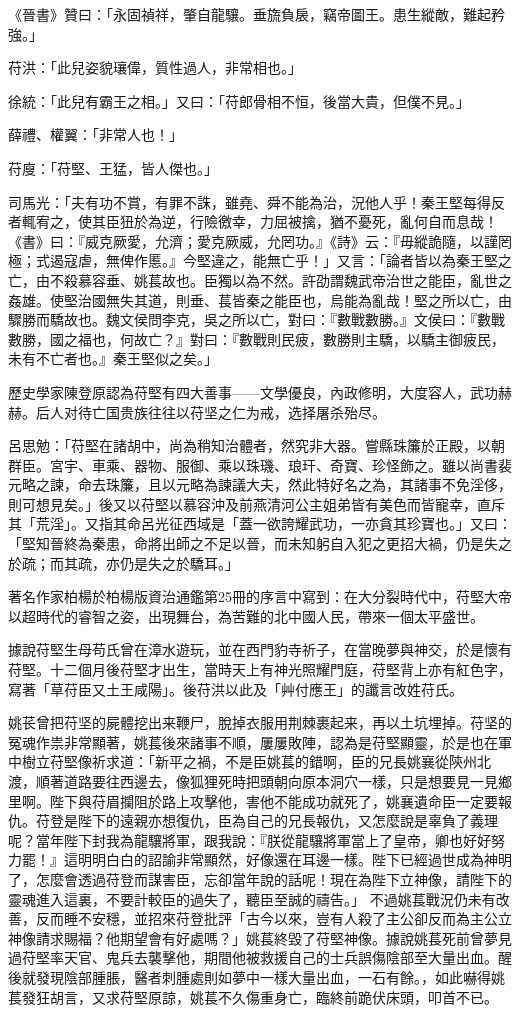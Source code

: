 《晉書》贊曰：「永固禎祥，肇自龍驤。垂旒負扆，竊帝圖王。患生縱敵，難起矜強。」

苻洪：「此兒姿貌瓖偉，質性過人，非常相也。」

徐統：「此兒有霸王之相。」又曰：「苻郎骨相不恒，後當大貴，但僕不見。」

薛禮、權翼：「非常人也！」

苻廋：「苻堅、王猛，皆人傑也。」

司馬光：「夫有功不賞，有罪不誅，雖堯、舜不能為治，況他人乎！秦王堅每得反者輒宥之，使其臣狃於為逆，行險徼幸，力屈被擒，猶不憂死，亂何自而息哉！《書》曰：『威克厥愛，允濟；愛克厥威，允罔功。』《詩》云：『毋縱詭隨，以謹罔極；式遏寇虐，無俾作慝。』今堅違之，能無亡乎！」又言：「論者皆以為秦王堅之亡，由不殺慕容垂、姚萇故也。臣獨以為不然。許劭謂魏武帝治世之能臣，亂世之姦雄。使堅治國無失其道，則垂、萇皆秦之能臣也，烏能為亂哉！堅之所以亡，由驟勝而驕故也。魏文侯問李克，吳之所以亡，對曰：『數戰數勝。』文侯曰：『數戰數勝，國之福也，何故亡？』對曰：『數戰則民疲，數勝則主驕，以驕主御疲民，未有不亡者也。』秦王堅似之矣。」

歷史學家陳登原認為苻堅有四大善事——文學優良，內政修明，大度容人，武功赫赫。后人对待亡国贵族往往以苻坚之仁为戒，选择屠杀殆尽。

呂思勉：「苻堅在諸胡中，尚為稍知治體者，然究非大器。嘗縣珠簾於正殿，以朝群臣。宮宇、車乘、器物、服御、乘以珠璣、琅玕、奇寶、珍怪飾之。雖以尚書裴元略之諫，命去珠簾，且以元略為諫議大夫，然此特好名之為，其諸事不免淫侈，則可想見矣。」後又以苻堅以慕容沖及前燕清河公主姐弟皆有美色而皆寵幸，直斥其「荒淫」。又指其命呂光征西域是「蓋一欲誇耀武功，一亦貪其珍寶也。」又曰：「堅知晉終為秦患，命將出師之不足以晉，而未知躬自入犯之更招大禍，仍是失之於疏；而其疏，亦仍是失之於驕耳。」

著名作家柏楊於柏楊版資治通鑑第25冊的序言中寫到：在大分裂時代中，苻堅大帝以超時代的睿智之姿，出現舞台，為苦難的北中國人民，帶來一個太平盛世。

據說苻堅生母苟氏曾在漳水遊玩，並在西門豹寺祈子，在當晚夢與神交，於是懷有苻堅。十二個月後苻堅才出生，當時天上有神光照耀門庭，苻堅背上亦有紅色字，寫著「草苻臣又土王咸陽」。後苻洪以此及「艸付應王」的讖言改姓苻氏。

姚苌曾把苻坚的屍體挖出来鞭尸，脫掉衣服用荆棘裹起来，再以土坑埋掉。苻坚的冤魂作祟非常顯著，姚萇後來諸事不順，屢屢敗陣，認為是苻堅顯靈，於是也在軍中樹立苻堅像祈求道：「新平之禍，不是臣姚萇的錯啊，臣的兄長姚襄從陝州北渡，順著道路要往西邊去，像狐狸死時把頭朝向原本洞穴一樣，只是想要見一見鄉里啊。陛下與苻眉攔阻於路上攻擊他，害他不能成功就死了，姚襄遺命臣一定要報仇。苻登是陛下的遠親亦想復仇，臣為自己的兄長報仇，又怎麼說是辜負了義理呢？當年陛下封我為龍驤將軍，跟我說：『朕從龍驤將軍當上了皇帝，卿也好好努力罷！』這明明白白的詔諭非常顯然，好像還在耳邊一樣。陛下已經過世成為神明了，怎麼會透過苻登而謀害臣，忘卻當年說的話呢！現在為陛下立神像，請陛下的靈魂進入這裏，不要計較臣的過失了，聽臣至誠的禱告。」 不過姚萇戰況仍未有改善，反而睡不安穩，並招來苻登批評「古今以來，豈有人殺了主公卻反而為主公立神像請求賜福？他期望會有好處嗎？」姚萇終毀了苻堅神像。據說姚萇死前曾夢見過苻堅率天官、鬼兵去襲擊他，期間他被救援自己的士兵誤傷陰部至大量出血。醒後就發現陰部腫脹，醫者刺腫處則如夢中一樣大量出血，一石有餘。，如此嚇得姚萇發狂胡言，又求苻堅原諒，姚萇不久傷重身亡，臨終前跪伏床頭，叩首不已。


